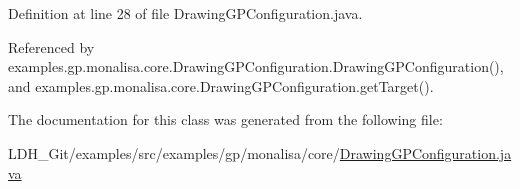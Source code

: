 Definition at line 28 of file Drawing\-G\-P\-Configuration.\-java.



Referenced by examples.\-gp.\-monalisa.\-core.\-Drawing\-G\-P\-Configuration.\-Drawing\-G\-P\-Configuration(), and examples.\-gp.\-monalisa.\-core.\-Drawing\-G\-P\-Configuration.\-get\-Target().



The documentation for this class was generated from the following file\-:\begin{DoxyCompactItemize}
\item 
L\-D\-H\-\_\-\-Git/examples/src/examples/gp/monalisa/core/\hyperlink{_drawing_g_p_configuration_8java}{Drawing\-G\-P\-Configuration.\-java}\end{DoxyCompactItemize}
